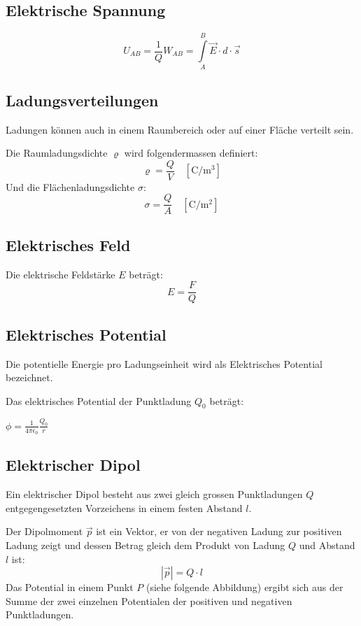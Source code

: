 \subsection{Elektrische Spannung}
\[
	U_{AB} = \frac{1}{Q} W_{AB} = \int\limits^B_A \vec{E} \cdot d \cdot \vec{s}
\]

\subsection{Ladungsverteilungen}

Ladungen können auch in einem Raumbereich oder auf einer Fläche verteilt sein.

Die Raumladungsdichte $\varrho$ wird folgendermassen definiert:
\[
	\varrho = \frac{Q}{V}
	\quad \left[ \textrm{C}/\textrm{m}^3 \right]
\]
Und die Flächenladungsdichte $\sigma$:
\[
	\sigma = \frac{Q}{A}
	\quad \left[ \textrm{C}/\textrm{m}^2 \right]
\]

\subsection{Elektrisches Feld}

Die elektrische Feldstärke $E$ beträgt:
\[
	E = \frac{F}{Q}
\]

\subsection{Elektrisches Potential}

Die potentielle Energie pro Ladungseinheit wird als Elektrisches Potential bezeichnet.

Das elektrisches Potential der Punktladung $Q_0$ beträgt:

$ \phi = \frac{1}{4\pi \epsilon_0} \frac{Q_0}{r} $

\subsection{Elektrischer Dipol}

Ein elektrischer Dipol besteht aus zwei gleich grossen Punktladungen $Q$
entgegengesetzten Vorzeichens in einem festen Abstand $l$.

Der Dipolmoment $\vec{p}$ ist ein Vektor, er von der negativen Ladung zur
positiven Ladung zeigt und dessen Betrag gleich dem Produkt von Ladung $Q$ und
Abstand $l$ ist:
\[
	|\vec{p}| = Q \cdot l
\]
Das Potential in einem Punkt $P$ (siehe folgende Abbildung) ergibt sich aus der
Summe der zwei einzelnen Potentialen der positiven und negativen Punktladungen.

